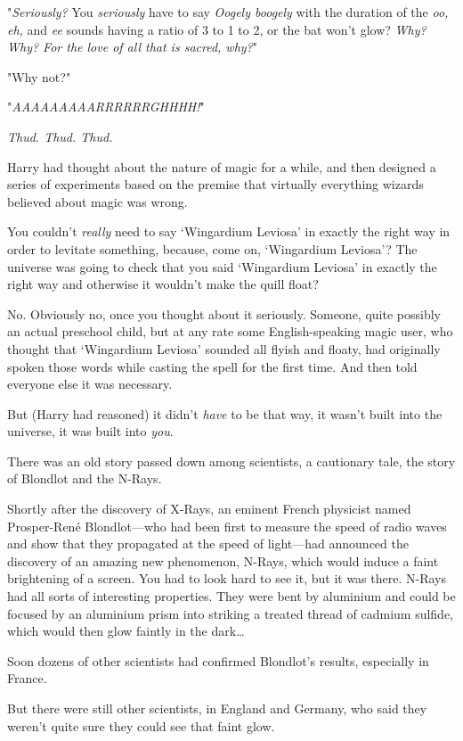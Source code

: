 "\emph{Seriously?} You \emph{seriously} have to say \emph{Oogely boogely} with
the duration of the \emph{oo, eh,} and \emph{ee} sounds having a ratio of 3 to
1 to 2, or the bat won't glow? \emph{Why? Why? For the love of all that is
sacred, why?}"

"Why not?"

"\emph{AAAAAAAAARRRRRRGHHHH!}"

\emph{Thud. Thud. Thud.}

Harry had thought about the nature of magic for a while, and then designed a
series of experiments based on the premise that virtually everything wizards
believed about magic was wrong.

You couldn't \emph{really} need to say `Wingardium Leviosa' in exactly the
right way in order to levitate something, because, come on, `Wingardium
Leviosa'? The universe was going to check that you said `Wingardium Leviosa' in
exactly the right way and otherwise it wouldn't make the quill float?

No. Obviously no, once you thought about it seriously. Someone, quite possibly
an actual preschool child, but at any rate some English-speaking magic user,
who thought that `Wingardium Leviosa' sounded all flyish and floaty, had
originally spoken those words while casting the spell for the first time. And
then told everyone else it was necessary.

But (Harry had reasoned) it didn't \emph{have} to be that way, it wasn't built
into the universe, it was built into \emph{you}.

There was an old story passed down among scientists, a cautionary tale, the
story of Blondlot and the N-Rays.

Shortly after the discovery of X-Rays, an eminent French physicist named
Prosper-René Blondlot---who had been first to measure the speed of radio waves
and show that they propagated at the speed of light---had announced the
discovery of an amazing new phenomenon, N-Rays, which would induce a faint
brightening of a screen. You had to look hard to see it, but it was there.
N-Rays had all sorts of interesting properties. They were bent by aluminium and
could be focused by an aluminium prism into striking a treated thread of
cadmium sulfide, which would then glow faintly in the dark{\ldots}

Soon dozens of other scientists had confirmed Blondlot's results, especially in
France.

But there were still other scientists, in England and Germany, who said they
weren't quite sure they could see that faint glow.

